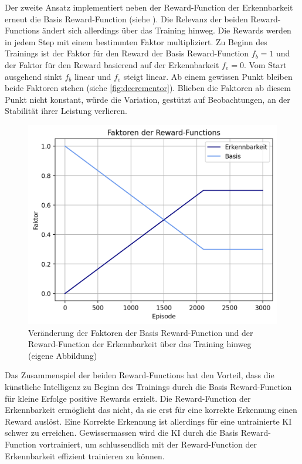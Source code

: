 Der zweite Ansatz implementiert neben der Reward-Function der Erkennbarkeit
erneut die Basis Reward-Function (siehe ). Die Relevanz
der beiden Reward-Functions ändert sich allerdings über das Training hinweg. Die
Rewards werden in jedem Step mit einem bestimmten Faktor multipliziert. Zu
Beginn des Trainings ist der Faktor für den Reward der Basis Reward-Function
$f_b = 1$ und der Faktor für den Reward basierend auf der Erkennbarkeit $f_e =
0$. Vom Start ausgehend sinkt $f_b$ linear und $f_e$ steigt linear. Ab einem
gewissen Punkt bleiben beide Faktoren stehen (siehe \autoref{fig:decrementor}).
Blieben die Faktoren ab diesem Punkt nicht konstant, würde die Variation,
gestützt auf Beobachtungen, an der Stabilität ihrer Leistung verlieren.

\begin{figure}[!ht]
  \centering
  \includegraphics[width=\textwidth-2cm]{images/methode/decrementor.png}
  \caption{Veränderung der Faktoren der Basis Reward-Function und der Reward-Function der Erkennbarkeit über das Training hinweg (eigene Abbildung)}\label{fig:decrementor}
\end{figure}

Das Zusammenspiel der beiden Reward-Functions hat den Vorteil, dass die
künstliche Intelligenz zu Beginn des Trainings durch die Basis Reward-Function
für kleine Erfolge positive Rewards erzielt. Die Reward-Function der
Erkennbarkeit ermöglicht das nicht, da sie erst für eine korrekte Erkennung
einen Reward auslöst. Eine Korrekte Erkennung ist allerdings für eine
untrainierte KI schwer zu erreichen. Gewissermassen wird die KI durch die Basis
Reward-Function vortrainiert, um schlussendlich mit der Reward-Function der
Erkennbarkeit effizient trainieren zu können.


